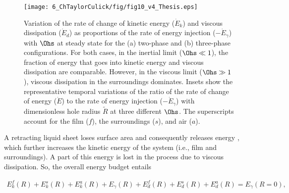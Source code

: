 \begin{figure}
	\centering
	\texttt{[image: 6\_ChTaylorCulick/fig/fig10\_v4\_Thesis.eps]}
	\caption{Variation of the rate of change of kinetic energy ($\dot{E}_k$) and viscous dissipation ($\dot{E}_d$) as proportions of the rate of energy injection ($-\dot{E}_\gamma$) with $\Ohs$ at steady state for the (a) two-phase and (b) three-phase configurations. For both cases, in the inertial limit ($\Ohs \ll 1$), the fraction of energy that goes into kinetic energy and viscous dissipation are comparable. However, in the viscous limit ($\Ohs \gg 1$), viscous dissipation in the surroundings dominates. Insets show the representative temporal variations of the ratio of the rate of change of energy ($\dot{E}$) to the rate of energy injection ($-\dot{E}_{\gamma}$) with dimensionless hole radius $\tilde{R}$ at three different $\Ohs$.  The superscripts account for the film ($f$), the surroundings ($s$), and air ($a$). }
	\label{fig:energy_rate}
\end{figure}

A retracting liquid sheet loses surface area and consequently releases energy \citep{dupre1867theorie, dupre1869theorie, rayleigh-1891-nature, culick-1960-japplphys}, which further increases the kinetic energy of the system (i.e., film and surroundings). A part of this energy is lost in the process due to viscous dissipation. So, the overall energy budget entails

\begin{align}
	E_k^f(R) + E_k^s(R) + E_k^a(R) + E_\gamma(R) + E_d^f(R) + E_d^s(R) + E_d^a(R) = E_\gamma(R = 0),
	\label{Eqn::OverallEnergyBalance}
\end{align}

